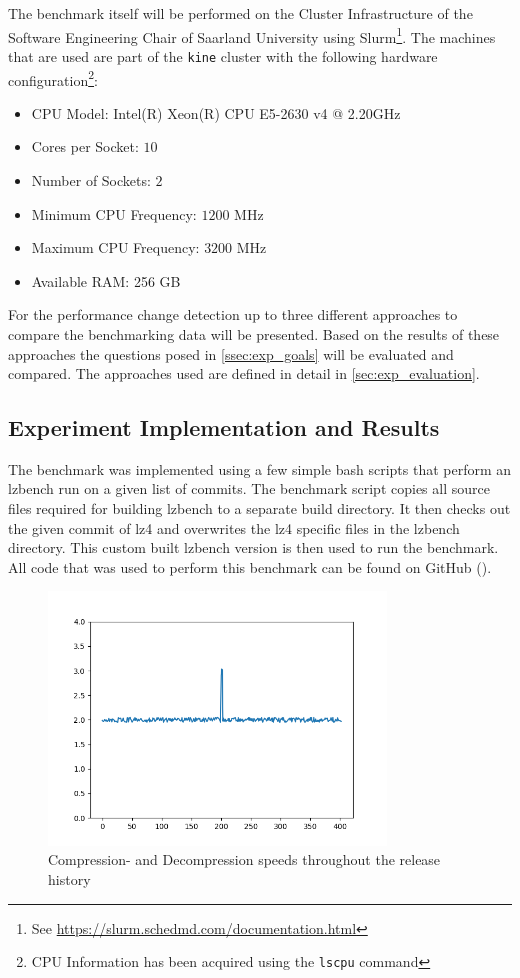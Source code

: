 \documentclass[	runningheads,
				a4paper]{llncs}
\begin{document}
The benchmark itself will be performed on the Cluster Infrastructure of the Software Engineering Chair of Saarland University using Slurm\footnote{See \url{https://slurm.schedmd.com/documentation.html}}. The machines that are used are part of the \texttt{kine} cluster with the following hardware configuration\footnote{CPU Information has been acquired using the \texttt{lscpu} command}:

\begin{itemize}
	\item CPU Model: Intel(R) Xeon(R) CPU E5-2630 v4 @ 2.20GHz
	\item Cores per Socket: $10$
	\item Number of Sockets: $2$
	\item Minimum CPU Frequency: $1200$ MHz
	\item Maximum CPU Frequency: $3200$ MHz
	\item Available RAM: 256 GB
\end{itemize}

For the performance change detection up to three different approaches to compare the benchmarking data will be presented. Based on the results of these approaches the questions posed in \autoref{ssec:exp_goals} will be evaluated and compared. The approaches used are defined in detail in \autoref{sec:exp_evaluation}.

	\subsection{Experiment Implementation and Results}

	The benchmark was implemented using a few simple bash scripts that perform an lzbench run on a given list of commits. The benchmark script copies all source files required for building lzbench to a separate build directory. It then checks out the given commit of lz4 and overwrites the lz4 specific files in the lzbench directory. This custom built lzbench version is then used to run the benchmark. All code that was used to perform this benchmark can be found on GitHub (\cite{TODO}).

	\begin{figure}[ht!]
		\centering
		\includegraphics[width=0.8\textwidth]{outlier}
		\caption{Compression- and Decompression speeds throughout the release history}
		\label{fig:release-bench}
	\end{figure}
\end{document}
